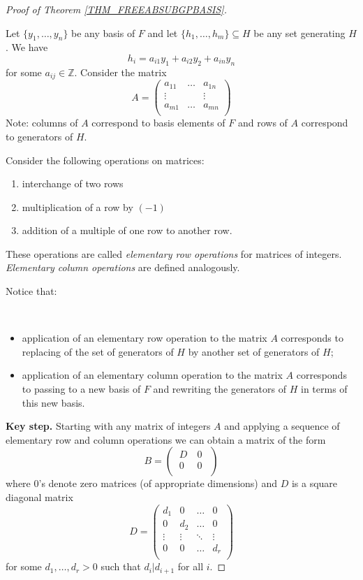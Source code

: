 \documentclass[12pt, letterpaper, oneside]{article}
\theoremstyle{plain}
\theoremstyle{definition}
\newcommand{\Z}{{\mathbb Z}}
\newcommand{\benu}{\begin{enumerate}}
\newcommand{\eenu}{\end{enumerate}}
\newcommand{\bit}{\begin{itemize}}
\newcommand{\eit}{\end{itemize}}
\newcommand{\vs}{\vskip 5mm}
\newcommand{\isep}[1][0]{\setlength{\itemsep}{#1 mm}}
\begin{document}
\vs\vs

\begin{proof}[Proof of Theorem \ref{THM_FREEABSUBGPBASIS}] \ 

Let $\{y_{1}, \dots, y_{n}\}$ be any basis of $F$ and let 
$\{h_{1}, \dots, h_{m}\}\subseteq H$ be any set generating $H$. 
We have
$$h_{i} = a_{i1}y_{1}+ a_{i2}y_{2} + a_{in}y_{n}$$
for some $a_{ij}\in \Z$. Consider the matrix
$$
A = 
\begin{pmatrix}
a_{11} & \dots & a_{1n} \\
\vdots & & \vdots \\
a_{m1} & \dots & a_{mn}\\
\end{pmatrix}
$$
Note: columns of $A$ correspond to basis elements of $F$ and rows of $A$ correspond 
to generators of $H$.

Consider the following operations on matrices:
\benu 
\isep
\item interchange of two rows
\item multiplication of a row by $(-1)$
\item addition of a multiple of one row to another row.
\eenu

These operations are called \emph{elementary row operations} for matrices of integers. 
\emph{Elementary column operations} are defined analogously.

Notice that: 

\vskip -13mm

\ 
\bit
\item application of an elementary row operation to the matrix $A$ corresponds to replacing of the set
of generators of $H$ by another set of generators of $H$;
\item application of an elementary column operation to the matrix $A$ corresponds to passing to a 
new basis of $F$ and rewriting the generators of $H$ in terms of this new basis. 
\eit

\textbf{Key step.} Starting with any matrix of integers $A$ and applying a sequence of 
elementary row and column operations  we can obtain a matrix
of the form 
$$
B = 
\begin{pmatrix}
\ D &\  0\ \  \\[1.5mm]
\ 0 &\  0\ \ \\
\end{pmatrix}$$
where $0$'s  denote zero matrices (of appropriate dimensions) and $D$ is a square 
diagonal matrix
$$
D = 
\begin{pmatrix}
d_{1} &  0         & \dots    & 0 \\
0         &  d_{2} & \dots    & 0 \\
\vdots & \vdots &  \ddots & \vdots \\ 
0          &  0        &  \dots   &  d_{r} \\
\end{pmatrix}
$$
for some $d_{1}, \dots, d_{r} > 0$ such that  $d_{i}|d_{i+1}$ for all $i$.


\end{proof}
\end{document}
